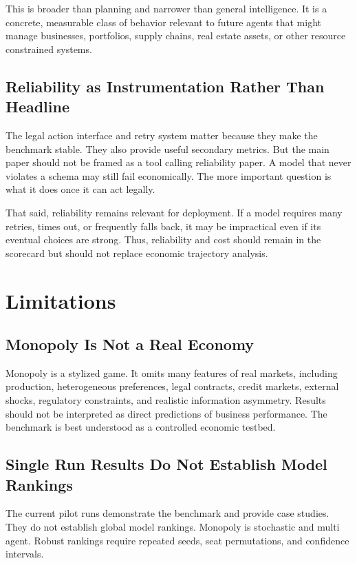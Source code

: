 \documentclass[conference]{IEEEtran}
\begin{document}
This is broader than planning and narrower than general intelligence. It is a concrete, measurable class of behavior relevant to future agents that might manage businesses, portfolios, supply chains, real estate assets, or other resource constrained systems.

\subsection{Reliability as Instrumentation Rather Than Headline}

The legal action interface and retry system matter because they make the benchmark stable. They also provide useful secondary metrics. But the main paper should not be framed as a tool calling reliability paper. A model that never violates a schema may still fail economically. The more important question is what it does once it can act legally.

That said, reliability remains relevant for deployment. If a model requires many retries, times out, or frequently falls back, it may be impractical even if its eventual choices are strong. Thus, reliability and cost should remain in the scorecard but should not replace economic trajectory analysis.

\section{Limitations}
\label{sec:limitations}

\subsection{Monopoly Is Not a Real Economy}

Monopoly is a stylized game. It omits many features of real markets, including production, heterogeneous preferences, legal contracts, credit markets, external shocks, regulatory constraints, and realistic information asymmetry. Results should not be interpreted as direct predictions of business performance. The benchmark is best understood as a controlled economic testbed.

\subsection{Single Run Results Do Not Establish Model Rankings}

The current pilot runs demonstrate the benchmark and provide case studies. They do not establish global model rankings. Monopoly is stochastic and multi agent. Robust rankings require repeated seeds, seat permutations, and confidence intervals.
\end{document}
